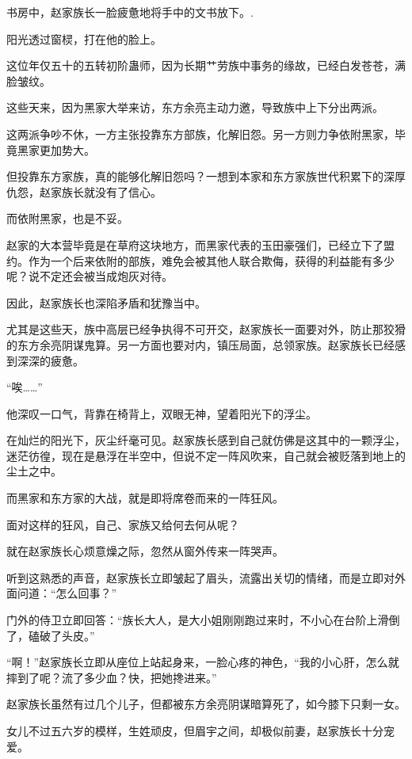 
\begin{this_body}

书房中，赵家族长一脸疲惫地将手中的文书放下。.

阳光透过窗棂，打在他的脸上。

这位年仅五十的五转初阶蛊师，因为长期艹劳族中事务的缘故，已经白发苍苍，满脸皱纹。

这些天来，因为黑家大举来访，东方余亮主动力邀，导致族中上下分出两派。

这两派争吵不休，一方主张投靠东方部族，化解旧怨。另一方则力争依附黑家，毕竟黑家更加势大。

但投靠东方家族，真的能够化解旧怨吗？一想到本家和东方家族世代积累下的深厚仇怨，赵家族长就没有了信心。

而依附黑家，也是不妥。

赵家的大本营毕竟是在草府这块地方，而黑家代表的玉田豪强们，已经立下了盟约。作为一个后来依附的部族，难免会被其他人联合欺侮，获得的利益能有多少呢？说不定还会被当成炮灰对待。

因此，赵家族长也深陷矛盾和犹豫当中。

尤其是这些天，族中高层已经争执得不可开交，赵家族长一面要对外，防止那狡猾的东方余亮阴谋鬼算。另一方面也要对内，镇压局面，总领家族。赵家族长已经感到深深的疲惫。

“唉……”

他深叹一口气，背靠在椅背上，双眼无神，望着阳光下的浮尘。

在灿烂的阳光下，灰尘纤毫可见。赵家族长感到自己就仿佛是这其中的一颗浮尘，迷茫彷徨，现在是悬浮在半空中，但说不定一阵风吹来，自己就会被贬落到地上的尘土之中。

而黑家和东方家的大战，就是即将席卷而来的一阵狂风。

面对这样的狂风，自己、家族又给何去何从呢？

就在赵家族长心烦意燥之际，忽然从窗外传来一阵哭声。

听到这熟悉的声音，赵家族长立即皱起了眉头，流露出关切的情绪，而是立即对外面问道：“怎么回事？”

门外的侍卫立即回答：“族长大人，是大小姐刚刚跑过来时，不小心在台阶上滑倒了，磕破了头皮。”

“啊！”赵家族长立即从座位上站起身来，一脸心疼的神色，“我的小心肝，怎么就摔到了呢？流了多少血？快，把她搀进来。”

赵家族长虽然有过几个儿子，但都被东方余亮阴谋暗算死了，如今膝下只剩一女。

女儿不过五六岁的模样，生姓顽皮，但眉宇之间，却极似前妻，赵家族长十分宠爱。


\end{this_body}
